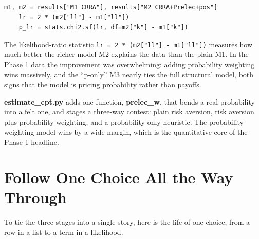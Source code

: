 \documentclass[11pt]{article}
\newcommand{\file}[1]{\textbf{\ttfamily #1}}
\begin{document}
\begin{lstlisting}[style=py,firstnumber=161]
    m1, m2 = results["M1 CRRA"], results["M2 CRRA+Prelec+pos"]
    lr = 2 * (m2["ll"] - m1["ll"])
    p_lr = stats.chi2.sf(lr, df=m2["k"] - m1["k"])
\end{lstlisting}

The likelihood-ratio statistic \verb|lr = 2 * (m2["ll"] - m1["ll"])| measures how much better the
richer model M2 explains the data than the plain M1. In the Phase 1 data the improvement was
overwhelming: adding probability weighting wins massively, and the ``p-only'' M3 nearly ties the full
structural model, both signs that the model is pricing probability rather than payoffs.

\begin{plainbox}
\file{estimate\_cpt.py} adds one function, \file{prelec\_w}, that bends a real probability into a felt
one, and stages a three-way contest: plain risk aversion, risk aversion plus probability weighting,
and a probability-only heuristic. The probability-weighting model wins by a wide margin, which is the
quantitative core of the Phase 1 headline.
\end{plainbox}

\section{Follow One Choice All the Way Through}

To tie the three stages into a single story, here is the life of one choice, from a row in a list to a
term in a likelihood.
\end{document}
